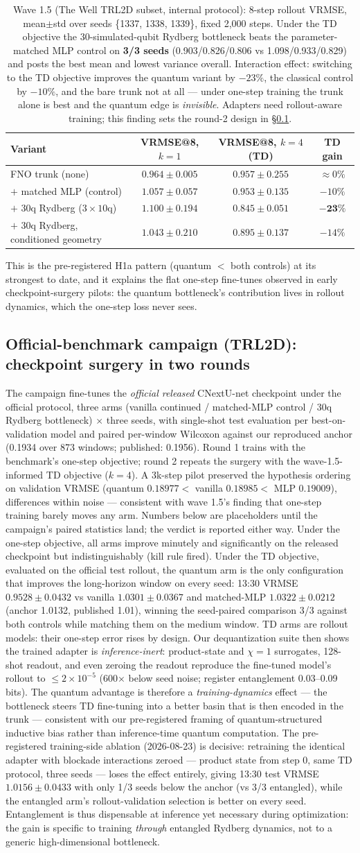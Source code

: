 \documentclass{article}
\newcommand{\TRLanchorRepro}{0.1934}  %
\newcommand{\TRLanchorPub}{0.1956}    %
\newcommand{\TRLwindows}{873}         %
\newcommand{\AblationVerdict}{The pre-registered training-side ablation
(2026-08-23) is decisive: retraining the identical adapter with blockade
interactions zeroed --- product state from step 0, same TD protocol, three
seeds --- loses the effect entirely, giving 13:30 test VRMSE
$1.0156 \pm 0.0433$ with only 1/3 seeds below the anchor (vs 3/3 entangled),
while the entangled arm's rollout-validation selection is better on every
seed. Entanglement is thus dispensable at inference yet necessary during
optimization: the gain is specific to training \emph{through} entangled
Rydberg dynamics, not to a generic high-dimensional bottleneck.}
\newcommand{\CampaignVerdict}{Under the one-step objective, all arms
improve minutely and significantly on the released checkpoint but
indistinguishably (kill rule fired). Under the TD objective, evaluated on the
official test rollout, the quantum arm is the only configuration that
improves the long-horizon window on every seed: 13:30 VRMSE
$0.9528 \pm 0.0432$ vs vanilla $1.0301 \pm 0.0367$ and matched-MLP
$1.0322 \pm 0.0212$ (anchor 1.0132, published 1.01), winning the seed-paired
comparison 3/3 against both controls while matching them on the medium
window. TD arms are rollout models: their one-step error rises by design.
Our dequantization suite then shows the trained adapter is
\emph{inference-inert}: product-state and $\chi{=}1$ surrogates, 128-shot
readout, and even zeroing the readout reproduce the fine-tuned model's
rollout to $\le 2{\times}10^{-5}$ (600$\times$ below seed noise; register
entanglement 0.03--0.09 bits). The quantum advantage is therefore a
\emph{training-dynamics} effect --- the bottleneck steers TD fine-tuning into
a better basin that is then encoded in the trunk --- consistent with our
pre-registered framing of quantum-structured inductive bias rather than
inference-time quantum computation. \AblationVerdict}
\begin{document}
\begin{table}[h]
\centering
\small
\begin{tabular}{lccc}
\toprule
Variant & VRMSE@8, $k{=}1$ & VRMSE@8, $k{=}4$ (TD) & TD gain \\
\midrule
FNO trunk (none) & $0.964 \pm 0.005$ & $0.957 \pm 0.255$ & $\approx 0\%$ \\
$+$ matched MLP (control) & $1.057 \pm 0.057$ & $0.953 \pm 0.135$ & $-10\%$ \\
$+$ 30q Rydberg ($3{\times}10$q) & $1.100 \pm 0.194$ & $\mathbf{0.845 \pm 0.051}$ & $\mathbf{-23\%}$ \\
$+$ 30q Rydberg, conditioned geometry & $1.043 \pm 0.210$ & $0.895 \pm 0.137$ & $-14\%$ \\
\bottomrule
\end{tabular}
\vspace{2pt}
\caption{Wave 1.5 (The Well TRL2D subset, internal protocol): 8-step rollout
VRMSE, mean$\pm$std over seeds \{1337, 1338, 1339\}, fixed 2{,}000 steps.
Under the TD objective the 30-simulated-qubit Rydberg bottleneck beats the
parameter-matched MLP control on \textbf{3/3 seeds} (0.903/0.826/0.806 vs
1.098/0.933/0.829) and posts the best mean and lowest variance overall.
Interaction effect: switching to the TD objective improves the quantum
variant by $-23\%$, the classical control by $-10\%$, and the bare trunk not
at all --- under one-step training the trunk alone is best and the quantum
edge is \emph{invisible}. Adapters need rollout-aware training; this finding
sets the round-2 design in \S\ref{sec:campaign}.}
\label{tab:wave15}
\end{table}

This is the pre-registered H1a pattern (quantum $<$ both controls) at its
strongest to date, and it explains the flat one-step fine-tunes observed in
early checkpoint-surgery pilots: the quantum bottleneck's contribution lives
in rollout dynamics, which the one-step loss never sees.

\subsection{Official-benchmark campaign (TRL2D): checkpoint surgery in two
rounds}
\label{sec:campaign}

The campaign fine-tunes the \emph{official released} CNextU-net checkpoint
under the official protocol, three arms (vanilla continued / matched-MLP
control / 30q Rydberg bottleneck) $\times$ three seeds, with single-shot
test evaluation per best-on-validation model and paired per-window Wilcoxon
against our reproduced anchor (\TRLanchorRepro{} over \TRLwindows{} windows;
published: \TRLanchorPub). Round 1 trains with the benchmark's one-step
objective; round 2 repeats the surgery with the wave-1.5-informed TD
objective ($k{=}4$). A 3k-step pilot preserved the hypothesis ordering on
validation VRMSE (quantum $0.18977 <$ vanilla $0.18985 <$ MLP $0.19009$),
differences within noise --- consistent with wave 1.5's finding that
one-step training barely moves any arm. Numbers below are placeholders
until the campaign's paired statistics land; the verdict is reported either
way. \CampaignVerdict
\end{document}
